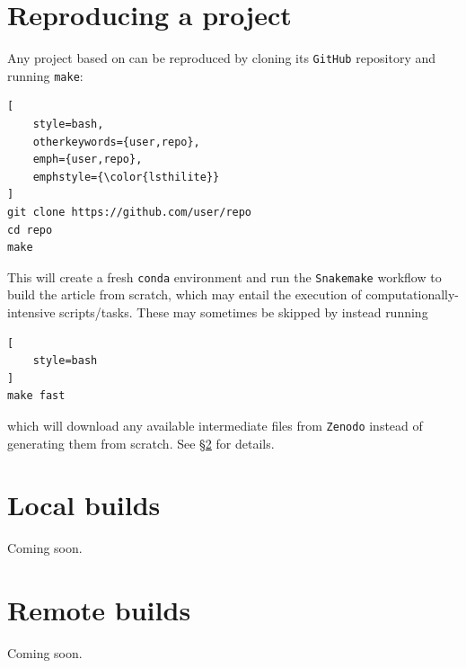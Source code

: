 \documentclass[twocolumn]{aastex631}
\begin{document}
\section{Reproducing a project}
\label{sec:reproduce}
%
Any project based on \showyourwork can be reproduced by cloning its \texttt{GitHub} repository and running \texttt{make}:
%
\begin{lstlisting}[
    style=bash,
    otherkeywords={user,repo},
    emph={user,repo},
    emphstyle={\color{lsthilite}}
]
git clone https://github.com/user/repo
cd repo
make
\end{lstlisting}
%
This will create a fresh \texttt{conda} environment and run the \texttt{Snakemake} workflow to build the article from scratch, which may entail the execution of computationally-intensive scripts/tasks.
These may sometimes be skipped by instead running
%
\begin{lstlisting}[
    style=bash
]
make fast
\end{lstlisting}
%
which will download any available intermediate files from \texttt{Zenodo} instead of generating them from scratch. See \S\ref{sec:local-builds} for details.

\section{Local builds}
\label{sec:local-builds}
%
Coming soon.

\section{Remote builds}
\label{sec:remote-builds}
%
Coming soon.
\end{document}

